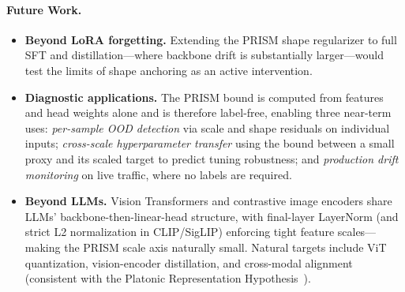 \documentclass{article}
\begin{document}
\paragraph{Future Work.}
\begin{itemize}[leftmargin=*,nosep,topsep=2pt]
    \item \textbf{Beyond LoRA forgetting.} Extending the PRISM shape regularizer to full SFT and distillation---where backbone drift is substantially larger---would test the limits of shape anchoring as an active intervention.
    \item \textbf{Diagnostic applications.} The PRISM bound is computed from features and head weights alone and is therefore label-free, enabling three near-term uses: \emph{per-sample OOD detection} via scale and shape residuals on individual inputs; \emph{cross-scale hyperparameter transfer} using the bound between a small proxy and its scaled target to predict tuning robustness; and \emph{production drift monitoring} on live traffic, where no labels are required.
    \item \textbf{Beyond LLMs.} Vision Transformers and contrastive image encoders share LLMs' backbone-then-linear-head structure, with final-layer LayerNorm (and strict L2 normalization in CLIP/SigLIP) enforcing tight feature scales---making the PRISM scale axis naturally small. Natural targets include ViT quantization, vision-encoder distillation, and cross-modal alignment (consistent with the Platonic Representation Hypothesis~\cite{huh2024platonic}).
\end{itemize}

\renewcommand{\bibname}{References}

 

\clearpage

\appendix








\newpage

\end{document}

